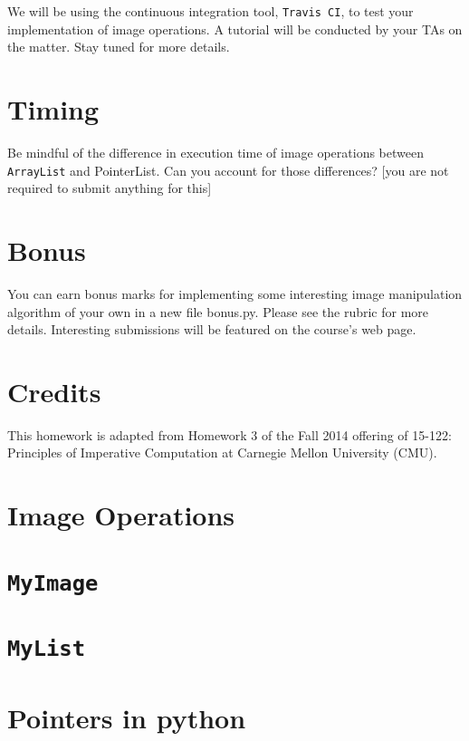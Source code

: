 \documentclass[addpoints]{exam}
\begin{document}
We will be using the continuous integration tool, \texttt{Travis CI}, to test your implementation of image operations. A tutorial will be conducted by your TAs on the matter. Stay tuned for more details.

\section{Timing}

Be mindful of the difference in execution time of image operations between \texttt{ArrayList} and \textsf{PointerList}. Can you account for those differences? [you are not required to submit anything for this]

\section{Bonus}

You can earn bonus marks for implementing some interesting image manipulation algorithm of your own in a new file  \textsf{bonus.py}. Please see the rubric for more details. Interesting submissions will be featured on the course's web page.

\section{Credits}

This homework is adapted from Homework 3 of the Fall 2014 offering of 15-122: Principles of Imperative Computation at Carnegie Mellon University (CMU).

\newpage
\appendix
\section{Image Operations}


\newpage
\section{\texttt{MyImage}}


\newpage
\section{\texttt{MyList}}


\newpage
\section{Pointers in python}




\end{document}
